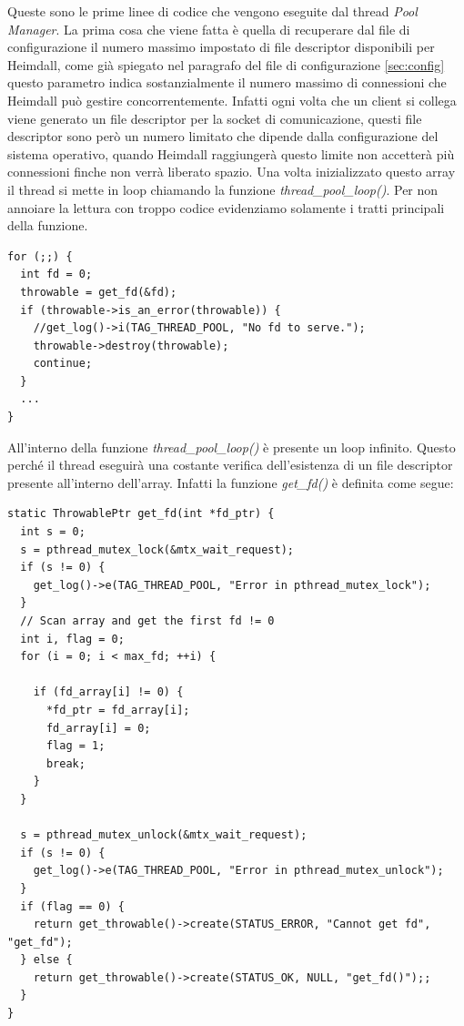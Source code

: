 \documentclass[italian]{tktltiki2}
\begin{document}
Queste sono le prime linee di codice che vengono eseguite dal thread \emph{Pool Manager}. La prima cosa che viene fatta è quella di recuperare dal file di configurazione il numero massimo impostato di file descriptor disponibili per Heimdall, come già spiegato nel paragrafo del file di configurazione \ref{sec:config} questo parametro indica sostanzialmente il numero massimo di connessioni che Heimdall può gestire concorrentemente. Infatti ogni volta che un client si collega viene generato un file descriptor per la socket di comunicazione, questi file descriptor sono però un numero limitato che dipende dalla configurazione del sistema operativo, quando Heimdall raggiungerà questo limite non accetterà più connessioni finche non verrà liberato spazio. Una volta inizializzato questo array il thread si mette in loop chiamando la funzione \emph{thread\_pool\_loop()}. Per non annoiare la lettura con troppo codice evidenziamo solamente i tratti principali della funzione.
\begin{lstlisting}
for (;;) {
  int fd = 0;
  throwable = get_fd(&fd);
  if (throwable->is_an_error(throwable)) {
    //get_log()->i(TAG_THREAD_POOL, "No fd to serve.");
    throwable->destroy(throwable);
    continue;
  }
  ...
}
\end{lstlisting}
All'interno della funzione \emph{thread\_pool\_loop()} è presente un loop infinito. Questo perché il thread eseguirà una costante verifica dell'esistenza di un file descriptor presente all'interno dell'array. Infatti la funzione \emph{get\_fd()} è definita come segue:
\begin{lstlisting}
static ThrowablePtr get_fd(int *fd_ptr) {
  int s = 0;
  s = pthread_mutex_lock(&mtx_wait_request);
  if (s != 0) {
    get_log()->e(TAG_THREAD_POOL, "Error in pthread_mutex_lock");
  }
  // Scan array and get the first fd != 0
  int i, flag = 0;
  for (i = 0; i < max_fd; ++i) {

    if (fd_array[i] != 0) {
      *fd_ptr = fd_array[i];
      fd_array[i] = 0;
      flag = 1;
      break;
    }
  }

  s = pthread_mutex_unlock(&mtx_wait_request); 
  if (s != 0) {
    get_log()->e(TAG_THREAD_POOL, "Error in pthread_mutex_unlock");
  }
  if (flag == 0) {
    return get_throwable()->create(STATUS_ERROR, "Cannot get fd", "get_fd");
  } else {
    return get_throwable()->create(STATUS_OK, NULL, "get_fd()");;
  }
}
\end{lstlisting}
\end{document}
